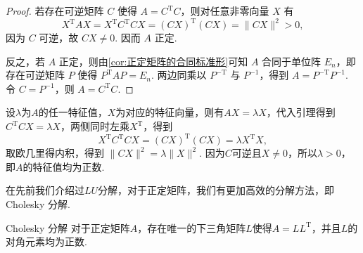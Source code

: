 \begin{proof}
    若存在可逆矩阵 $C$ 使得 $A=C^\mathrm{T}C$，则对任意非零向量 $X$ 有
    \[
        X^\mathrm{T}AX=X^\mathrm{T}C^\mathrm{T}CX=(CX)^\mathrm{T}(CX)=\|CX\|^2>0,
    \]
    因为 $C$ 可逆，故 $CX\neq 0$. 因而 $A$ 正定.

    反之，若 $A$ 正定，则由\autoref{cor:正定矩阵的合同标准形}可知 $A$ 合同于单位阵 $E_n$，即存在可逆矩阵 $P$ 使得 $P^\mathrm{T}AP=E_n$. 两边同乘以 $P^{-\mathrm{T}}$ 与 $P^{-1}$，得到 $A=P^{-\mathrm{T}}P^{-1}$. 令 $C=P^{-1}$，则 $A=C^\mathrm{T}C$.
\end{proof}

设$\lambda$为$A$的任一特征值，$X$为对应的特征向量，则有$AX = \lambda X$，代入引理得到$C^\mathrm{T}CX = \lambda X$，两侧同时左乘$X^\mathrm{T}$，得到
\[ X^\mathrm{T}C^\mathrm{T}CX = (CX)^\mathrm{T}(CX) = \lambda X^\mathrm{T}X, \]
取欧几里得内积，得到 $\|CX\|^2 = \lambda \|X\|^2$. 因为$C$可逆且$X \neq 0$，所以$\lambda > 0$，即$A$的特征值均为正数.

在先前我们介绍过$LU$分解，对于正定矩阵，我们有更加高效的分解方法，即 Cholesky 分解.

\begin{theorem}{}{Cholesky 分解}
    对于正定矩阵$A$，存在唯一的下三角矩阵$L$使得$A=LL^\mathrm{T}$，并且$L$的对角元素均为正数.
\end{theorem}

